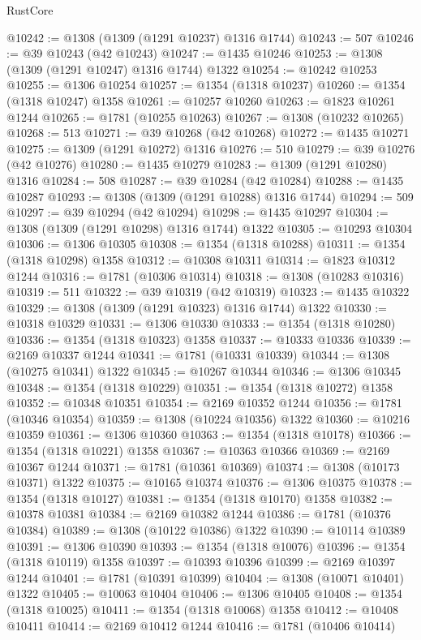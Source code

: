 \begin{lexlean}{RustCore}
\begin{coremodule}
@10242 := @1308 (@1309 (@1291 @10237) @1316 @1744)
@10243 := 507
@10246 := @39 @10243 (@42 @10243)
@10247 := @1435 @10246
@10253 := @1308 (@1309 (@1291 @10247) @1316 @1744) @1322
@10254 := @10242 @10253
@10255 := @1306 @10254
@10257 := @1354 (@1318 @10237)
@10260 := @1354 (@1318 @10247) @1358
@10261 := @10257 @10260
@10263 := @1823 @10261 @1244
@10265 := @1781 (@10255 @10263)
@10267 := @1308 (@10232 @10265)
@10268 := 513
@10271 := @39 @10268 (@42 @10268)
@10272 := @1435 @10271
@10275 := @1309 (@1291 @10272) @1316
@10276 := 510
@10279 := @39 @10276 (@42 @10276)
@10280 := @1435 @10279
@10283 := @1309 (@1291 @10280) @1316
@10284 := 508
@10287 := @39 @10284 (@42 @10284)
@10288 := @1435 @10287
@10293 := @1308 (@1309 (@1291 @10288) @1316 @1744)
@10294 := 509
@10297 := @39 @10294 (@42 @10294)
@10298 := @1435 @10297
@10304 := @1308 (@1309 (@1291 @10298) @1316 @1744) @1322
@10305 := @10293 @10304
@10306 := @1306 @10305
@10308 := @1354 (@1318 @10288)
@10311 := @1354 (@1318 @10298) @1358
@10312 := @10308 @10311
@10314 := @1823 @10312 @1244
@10316 := @1781 (@10306 @10314)
@10318 := @1308 (@10283 @10316)
@10319 := 511
@10322 := @39 @10319 (@42 @10319)
@10323 := @1435 @10322
@10329 := @1308 (@1309 (@1291 @10323) @1316 @1744) @1322
@10330 := @10318 @10329
@10331 := @1306 @10330
@10333 := @1354 (@1318 @10280)
@10336 := @1354 (@1318 @10323) @1358
@10337 := @10333 @10336
@10339 := @2169 @10337 @1244
@10341 := @1781 (@10331 @10339)
@10344 := @1308 (@10275 @10341) @1322
@10345 := @10267 @10344
@10346 := @1306 @10345
@10348 := @1354 (@1318 @10229)
@10351 := @1354 (@1318 @10272) @1358
@10352 := @10348 @10351
@10354 := @2169 @10352 @1244
@10356 := @1781 (@10346 @10354)
@10359 := @1308 (@10224 @10356) @1322
@10360 := @10216 @10359
@10361 := @1306 @10360
@10363 := @1354 (@1318 @10178)
@10366 := @1354 (@1318 @10221) @1358
@10367 := @10363 @10366
@10369 := @2169 @10367 @1244
@10371 := @1781 (@10361 @10369)
@10374 := @1308 (@10173 @10371) @1322
@10375 := @10165 @10374
@10376 := @1306 @10375
@10378 := @1354 (@1318 @10127)
@10381 := @1354 (@1318 @10170) @1358
@10382 := @10378 @10381
@10384 := @2169 @10382 @1244
@10386 := @1781 (@10376 @10384)
@10389 := @1308 (@10122 @10386) @1322
@10390 := @10114 @10389
@10391 := @1306 @10390
@10393 := @1354 (@1318 @10076)
@10396 := @1354 (@1318 @10119) @1358
@10397 := @10393 @10396
@10399 := @2169 @10397 @1244
@10401 := @1781 (@10391 @10399)
@10404 := @1308 (@10071 @10401) @1322
@10405 := @10063 @10404
@10406 := @1306 @10405
@10408 := @1354 (@1318 @10025)
@10411 := @1354 (@1318 @10068) @1358
@10412 := @10408 @10411
@10414 := @2169 @10412 @1244
@10416 := @1781 (@10406 @10414)

\end{coremodule}
\end{lexlean}
